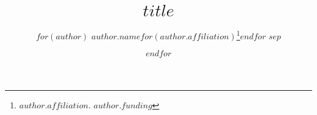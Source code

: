 %

\title{$title$}
\author{%
    $for(author)$
    $author.name$$for(author.affiliation)$\thanks{$author.affiliation$. $author.funding$}$endfor$
    $sep$ \and
    $endfor$
}

\newcommand{\makeabstract}{
\begin{abstract}
$if(abstract)$
    $abstract$
$else$
    Please write an abstract in the \texttt{paper-meta.yaml} file.
$endif$
\end{abstract}
}
